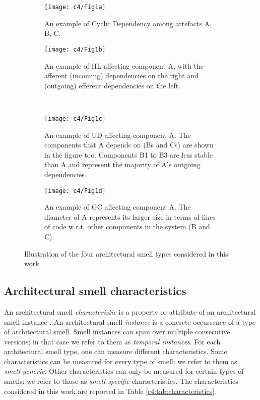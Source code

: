 \begin{figure}[t]
    \centering
    \begin{subfigure}[t]{0.45\linewidth}
        \centering
        \texttt{[image: c4/Fig1a]}
        \caption{An example of Cyclic Dependency among artefacts A, B, C.}\label{c4:fig:cd}
    \end{subfigure}
    \hfill
    \begin{subfigure}[t]{0.45\linewidth}
        \centering
        \texttt{[image: c4/Fig1b]}
        \caption{An example of HL affecting component A, with the afferent (incoming) dependencies on the right and (outgoing) efferent dependencies on the left.}\label{c4:fig:hl}
    \end{subfigure}
    \\
    \begin{subfigure}[t]{0.45\linewidth}
        \centering
        \texttt{[image: c4/Fig1c]}
        \caption{An example of UD affecting component A. The components that A depends on (Bs and Cs) are shown in the figure too. Components B1 to B3 are less stable than A and represent the majority of A's outgoing dependencies.}\label{c4:fig:ud}
    \end{subfigure}
    \hfill
    \begin{subfigure}[t]{0.45\linewidth}
        \centering
        \texttt{[image: c4/Fig1d]}
        \caption{An example of GC affecting component A. The diameter of A represents its larger size in terms of lines of code w.r.t. other components in the system (B and C).}\label{c4:fig:gc}
    \end{subfigure}
    \caption{Illustration of the four architectural smell types considered in this work.}
    \label{c4:fig:architectural-smells} 
\end{figure}


\subsection{Architectural smell characteristics}\label{c4:sec:characteristics}
An architectural smell \emph{characteristic} is a property or attribute of an architectural smell instance \cite{Sas2019}. 
An architectural smell \emph{instance} is a concrete occurrence of a type of architectural smell.
Smell instances can span over multiple consecutive versions; in that case we refer to them as \emph{temporal instances}.
For each architectural smell type, one can measure different characteristics. Some characteristics can be measured for every type of smell; we refer to them as \emph{smell-generic}. Other characteristics can only be measured for certain types of smells; we refer to those as \emph{smell-specific} characteristics.
The characteristics considered in this work are reported in Table \ref{c4:tab:characteristics}.

